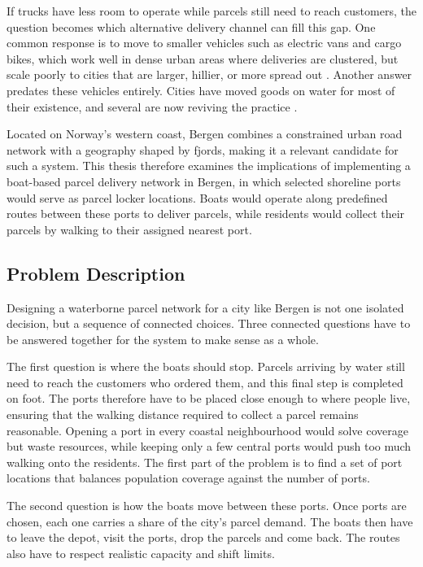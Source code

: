 \documentclass[12pt]{article}
\begin{document}
If trucks have less room to operate while parcels still need to reach customers, the question becomes which alternative delivery channel can fill this gap. One common response is to move to smaller vehicles such as electric vans and cargo bikes, which work well in dense urban areas where deliveries are clustered, but scale poorly to cities that are larger, hillier, or more spread out \parencite{NARAYANAN2022278}. Another answer predates these vehicles entirely. Cities have moved goods on water for most of their existence, and several are now reviving the practice \parencite{dhlboats,fludis}.

Located on Norway's western coast, Bergen combines a constrained urban road network with a geography shaped by fjords, making it a relevant candidate for such a system. This thesis therefore examines the implications of implementing a boat-based parcel delivery network in Bergen, in which selected shoreline ports would serve as parcel locker locations. Boats would operate along predefined routes between these ports to deliver parcels, while residents would collect their parcels by walking to their assigned nearest port.

\subsection{Problem Description}
\label{subsec:problem-description}

Designing a waterborne parcel network for a city like Bergen is not one isolated decision, but a sequence of connected choices. Three connected questions have to be answered together for the system to make sense as a whole.

The first question is where the boats should stop. Parcels arriving by water still need to reach the customers who ordered them, and this final step is completed on foot. The ports therefore have to be placed close enough to where people live, ensuring that the walking distance required to collect a parcel remains reasonable. Opening a port in every coastal neighbourhood would solve coverage but waste resources, while keeping only a few central ports would push too much walking onto the residents. The first part of the problem is to find a set of port locations that balances population coverage against the number of ports.

The second question is how the boats move between these ports. Once ports are chosen, each one carries a share of the city's parcel demand. The boats then have to leave the depot, visit the ports, drop the parcels and come back. The routes also have to respect realistic capacity and shift limits.
\end{document}
